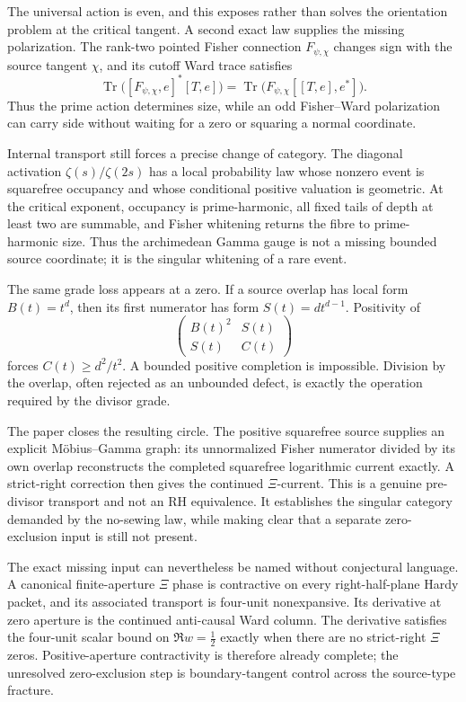 \documentclass[11pt]{article}
\theoremstyle{definition}
\theoremstyle{remark}
\begin{document}
The universal action is even, and this exposes rather than solves the orientation problem at the
critical tangent.  A second exact law supplies the missing polarization.  The rank-two pointed
Fisher connection \(F_{\psi,\chi}\) changes sign with the source tangent \(\chi\), and its
cutoff Ward trace satisfies
\[
 \operatorname{Tr}\bigl([F_{\psi,\chi},e]^*[T,e]\bigr)
 =
 \operatorname{Tr}\bigl(F_{\psi,\chi}[[T,e],e^*]\bigr).
 \tag{1.14}\label{eq:signed-transgression-intro}
\]
Thus the prime action determines size, while an odd Fisher--Ward polarization can carry side
without waiting for a zero or squaring a normal coordinate.

Internal transport still forces a precise change of category.  The diagonal activation
\(\zeta(s)/\zeta(2s)\) has a local probability law whose nonzero event is squarefree occupancy
and whose conditional positive valuation is geometric.  At the critical exponent, occupancy is
prime-harmonic, all fixed tails of depth at least two are summable, and Fisher whitening returns
the fibre to prime-harmonic size.  Thus the archimedean Gamma gauge is not a missing bounded
source coordinate; it is the singular whitening of a rare event.

The same grade loss appears at a zero.  If a source overlap has local form \(B(t)=t^d\), then its
first numerator has form \(S(t)=dt^{d-1}\).  Positivity of
\[
 \begin{pmatrix}B(t)^2&S(t)\\S(t)&C(t)\end{pmatrix}
 \tag{1.15}\label{eq:gram-intro}
\]
forces \(C(t)\geq d^2/t^2\).  A bounded positive completion is impossible.  Division by the
overlap, often rejected as an unbounded defect, is exactly the operation required by the divisor
grade.

The paper closes the resulting circle.  The positive squarefree source supplies an explicit
M\"obius--Gamma graph: its unnormalized Fisher numerator divided by its own overlap reconstructs
the completed squarefree logarithmic current exactly.  A strict-right correction then gives the
continued \(\Xi\)-current.  This is a genuine pre-divisor transport and not an RH equivalence.
It establishes the singular category demanded by the no-sewing law, while making clear that a
separate zero-exclusion input is still not present.

The exact missing input can nevertheless be named without conjectural language.  A canonical
finite-aperture \(\Xi\) phase is contractive on every right-half-plane Hardy packet, and its
associated transport is four-unit nonexpansive.  Its derivative at zero aperture is the
continued anti-causal Ward column.  The derivative satisfies the four-unit scalar bound on
\(\Re w=\tfrac12\) exactly when there are no strict-right \(\Xi\) zeros.  Positive-aperture
contractivity is therefore already complete; the unresolved zero-exclusion step is
boundary-tangent control across the source-type fracture.
\end{document}
